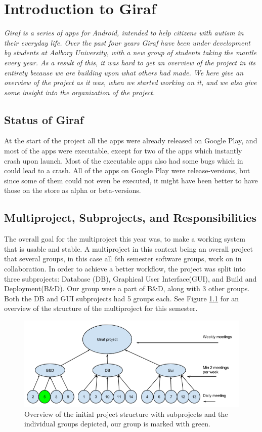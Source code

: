 \chapter{Introduction to Giraf} \label{ChapIntroduction}
\textit{Giraf is a series of apps for Android, intended to help citizens with autism in their everyday life. Over the past four years Giraf have been under development by students at Aalborg University, with a new group of students taking the mantle every year. As a result of this, it was hard to get an overview of the project in its entirety because we are building upon what others had made. We here give an overview of the project as it was, when we started working on it, and we also give some insight into the organization of the project.}

\section{Status of Giraf} %
At the start of the project all the apps were already released on Google Play, and most of the apps were executable, except for two of the apps which instantly crash upon launch. Most of the executable apps also had some bugs which in could lead to a crash. All of the apps on Google Play were release-versions, but since some of them could not even be executed, it might have been better to have those on the store as alpha or beta-versions.

\section{Multiproject, Subprojects, and Responsibilities} %
The overall goal for the multiproject this year was, to make a working system that is usable and stable. A multiproject in this context being an overall project that several groups, in this case all 6th semester software groups, work on in collaboration. In order to achieve a better workflow, the project was split into three subprojects: Database (DB), Graphical User Interface(GUI), and Build and Deployment(B\&D). Our group were a part of B\&D, along with 3 other groups. Both the DB and GUI subprojects had 5 groups each. See Figure \ref{ScrumOfScrumsOverview} for an overview of the structure of the multiproject for this semester.

\begin{figure}
	\centering
	\includegraphics[width=0.8 \textwidth]{pictures/ScrumOfScrum.png}
	\caption{Overview of the initial project structure with subprojects and the individual groups depicted, our group is marked with green.}
	\label{ScrumOfScrumsOverview}
\end{figure}


